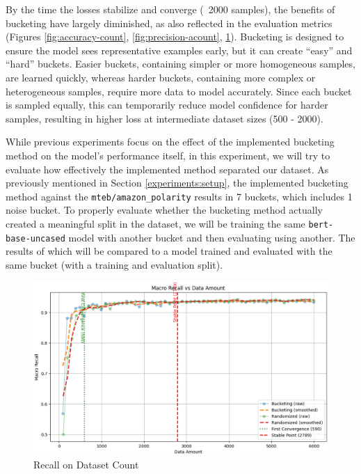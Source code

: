 \documentclass[twocolumn]{article}
\newcounter{ex}
\renewcommand{\indent}{\hspace*{2em}}
\begin{document}
\indent By the time the losses stabilize and converge (~2000 samples), the benefits of bucketing have largely diminished, as also reflected in the evaluation metrics (Figures \ref{fig:accuracy-count}, \ref{fig:precision-acount}, \ref{fig:recall-count}). Bucketing is designed to ensure the model sees representative examples early, but it can create “easy” and “hard” buckets. Easier buckets, containing simpler or more homogeneous samples, are learned quickly, whereas harder buckets, containing more complex or heterogeneous samples, require more data to model accurately. Since each bucket is sampled equally, this can temporarily reduce model confidence for harder samples, resulting in higher loss at intermediate dataset sizes (500 - 2000).

\indent While previous experiments focus on the effect of the implemented bucketing method on the model's performance itself, in this experiment, we will try to evaluate how effectively the implemented method separated our dataset. As previously mentioned in Section \ref{experiments:setup}, the implemented bucketing method against the \texttt{mteb/amazon\_polarity} results in 7 buckets, which includes 1 noise bucket. To properly evaluate whether the bucketing method actually created a meaningful split in the dataset, we will be training the same \texttt{bert-base-uncased} model with another bucket and then evaluating using another. The results of which will be compared to a model trained and evaluated with the same bucket (with a training and evaluation split).

\begin{figure}[H]
    \centering
    \includegraphics[width=\linewidth]{recall-count-2.eps}
    \caption{Recall on Dataset Count}
    \label{fig:recall-count}
\end{figure}
\end{document}
